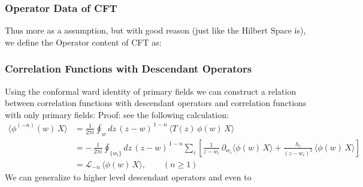 \subsubsection{Operator Data of CFT}

Thus more as a assumption, but with good reason (just like the
Hilbert Space is), we define the Operator content of CFT as:

\subsubsection{Correlation Functions with Descendant Operators}

Using the conformal ward identity of primary fields we can construct
a relation between correlation functions with descendant operators
and correlation functions with only primary fields:
Proof: see the following calculation:
\begin{align}
  \langle \phi^{(-n)}(w)\,X \rangle
  &= \frac{1}{2\pi i}\oint_{w} dz\,(z-w)^{\,1-n}\,
  \langle T(z)\,\phi(w)\,X \rangle \\[6pt]
  &= -\,\frac{1}{2\pi i}
  \oint_{\{w_i\}} dz\,(z-w)^{\,1-n}
  \sum_i \left[
    \frac{1}{z-w_i}\,\partial_{w_i}\langle \phi(w)\,X\rangle
    + \frac{h_i}{(z-w_i)^2}\,\langle \phi(w)\,X\rangle
  \right] \\[6pt]
  & = \mathcal{L}_{-n}\,\langle \phi(w)\,X\rangle ,
  \qquad (n\ge 1)
\end{align}
We can generalize to higher level descendant operators and even to
